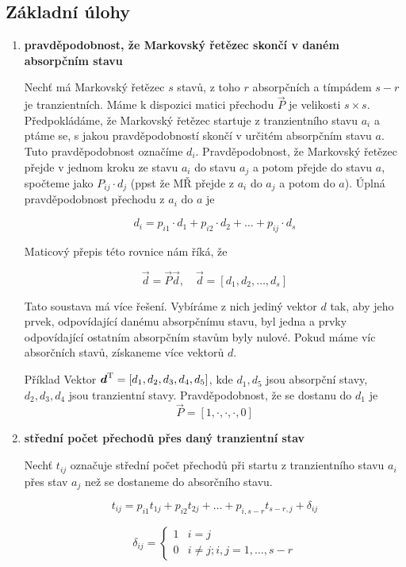 \subsection{Základní úlohy}
\begin{enumerate}[label=\arabic*)]
\item \textbf{pravděpodobnost, že Markovský řetězec skončí v daném absorpčním stavu}\br

	Nechť má Markovský řetězec $s$ stavů, z toho $r$ absorpčních a tímpádem $s-r$ je tranzientních. Máme k dispozici matici přechodu $\vec{P}$ je velikosti $s\times s$. Předpokládáme, že Markovský řetězec startuje z tranzientního stavu $a_i$ a ptáme se, s jakou pravděpodobností skončí v určitém absorpčním stavu $a$. Tuto pravděpodobnost označíme $d_i$. Pravděpodobnost, že Markovský řetězec přejde v jednom kroku ze stavu $a_i$ do stavu $a_j$ a potom přejde do stavu $a$, spočteme jako $P_{ij}\cdot d_j$ (ppst že MŘ přejde z $a_i$ do $a_j$ a potom do $a$). Úplná pravděpodobnost přechodu z $a_i$ do $a$ je

	\[ d_i=p_{i1}\cdot d_1+ p_{i2}\cdot d_2 + \ldots + p_{ij}\cdot d_s \]

	Maticový přepis této rovnice nám říká, že

	\[ \vec{d} = \vec{P}\vec{d},\quad \vec{d}=[d_1,d_2,\ldots,d_s] \]

	Tato soustava má více řešení. Vybíráme z nich jediný vektor $d$ tak, aby jeho prvek, odpovídající danému absorpčnímu stavu,  byl jedna a prvky odpovídající ostatním absorpčním stavům byly nulové. Pokud máme víc absorčních stavů, získaneme více vektorů $d$.

	\begin{note}{Příklad}
		Vektor $\boldsymbol{d}^{\mathrm{T}}=[d_1,d_2,d_3,d_4,d_5]$, kde $d_1,d_5$ jsou absorpční stavy, $d_2,d_3,d_4$ jsou tranzientní stavy. Pravděpodobnost, že se dostanu do $d_1$ je
		\[ \vec{P} = [1,\cdot,\cdot,\cdot,0] \]

	\end{note}

\item \textbf{střední počet přechodů přes daný tranzientní stav}\br

	Nechť $t_{ij}$ označuje střední počet přechodů při startu z tranzientního stavu $a_i$ přes stav $a_j$ než se dostaneme do absorčního stavu.

	\[ t_{ij}=p_{i1}t_{1j}+p_{i2}t_{2j}+\ldots+p_{i,s-r}t_{s-r,j}+\delta_{ij} \]

	\[ \delta_{ij}=
	\begin{cases}
	1 & i=j\\
	0 & i\neq j; i,j = 1,\ldots, s-r
	\end{cases}
	\]


\end{enumerate}
